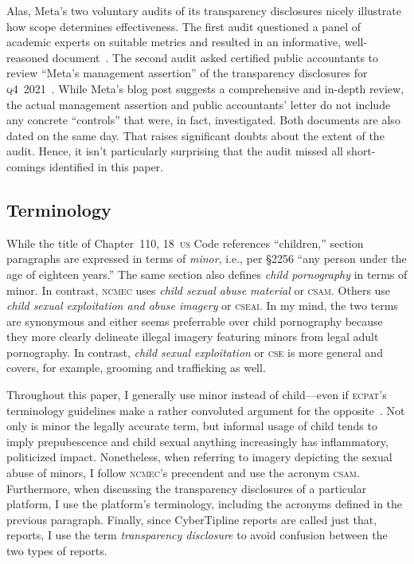 \documentclass[nonacm,screen]{acmart}
\newcommand\V[1]{\textsc{\MakeLowercase{#1}}}
\begin{document}
Alas, Meta's two voluntary audits of its transparency disclosures nicely
illustrate how scope determines effectiveness. The first audit questioned a
panel of academic experts on suitable metrics and resulted in an informative,
well-reasoned document~\cite{BradfordGriselea2019,Plumb2019}. The second audit
asked certified public accountants to review ``Meta's management assertion'' of
the transparency disclosures for \V{Q4}~2021~\cite{Meta2022,Sarang2022}. While
Meta's blog post suggests a comprehensive and in-depth review, the actual
management assertion and public accountants' letter do not include any concrete
``controls'' that were, in fact, investigated. Both documents are also dated on
the same day. That raises significant doubts about the extent of the audit.
Hence, it isn't particularly surprising that the audit missed all short-comings
identified in this paper.


\subsection{Terminology}
\label{sec:terminology}

While the title of Chapter~110, 18~\V{US} Code references ``children,'' section
paragraphs are expressed in terms of \emph{minor}, i.e., per \S2256 ``any person
under the age of eighteen years.'' The same section also defines \emph{child
pornography} in terms of minor. In contrast, \V{NCMEC} uses \emph{child sexual
abuse material} or \V{CSAM}. Others use \emph{child sexual exploitation and
abuse imagery} or \V{CSEAI}. In my mind, the two terms are synonymous and either
seems preferrable over child pornography because they more clearly delineate
illegal imagery featuring minors from legal adult pornography. In contrast,
\emph{child sexual exploitation} or \V{CSE} is more general and covers, for
example, grooming and trafficking as well.

Throughout this paper, I generally use minor instead of child---even if
\V{ECPAT}'s terminology guidelines make a rather convoluted argument for the
opposite~\cite{GreijerDoek2016}. Not only is minor the legally accurate term,
but informal usage of child tends to imply prepubescence and child sexual
anything increasingly has inflammatory, politicized impact. Nonetheless, when
referring to imagery depicting the sexual abuse of minors, I follow \V{NCMEC}'s
precendent and use the acronym \V{CSAM}. Furthermore, when discussing the
transparency disclosures of a particular platform, I use the platform's
terminology, including the acronyms defined in the previous paragraph. Finally,
since CyberTipline reports are called just that, reports, I use the term
\emph{transparency disclosure} to avoid confusion between the two types of
reports.
\end{document}
